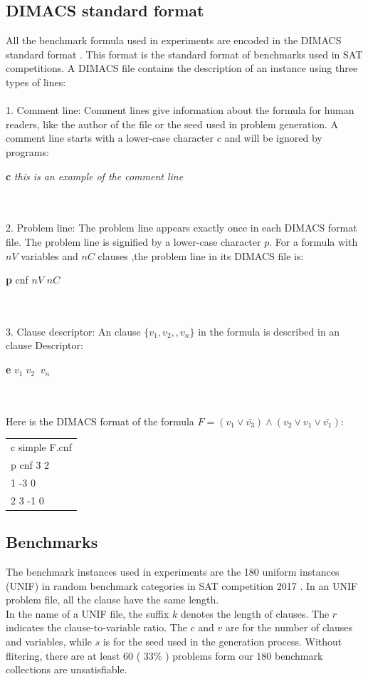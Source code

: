 \documentclass[12pt,a4paper,twoside]{scrartcl}
\numberwithin{equation}{section}
\begin{document}
\subsection{DIMACS standard format}  
All the benchmark formula used in experiments are encoded in the DIMACS standard format \cite{balyo2017proceedings}. This format is the standard format of benchmarks used in SAT competitions. A DIMACS file contains the description of an instance using three types of lines:\\
\\ 1. Comment line: Comment lines give information about the formula for human readers, like the author of the file or the seed used in problem generation. A comment line starts with a lower-case character $c$ and will be ignored by programs:\\ \centerline{\textbf{c} \emph{ this is an example of the comment line }}\\ \\ 2. Problem line: The problem line appears exactly once in each DIMACS format file. The problem line is signified by a lower-case character $p$.  For a formula with $nV$ variables and $nC$ clauses ,the problem line in its DIMACS file is:\\ \centerline{\textbf{p} cnf $nV$ $nC$}\\ \\ 3. Clause descriptor: An clause $\{v_1, v_2,, v_n\}$ in the formula is described in an clause Descriptor:\\ \centerline{\textbf{e} $v_1\; v_2\;  \;v_n$}\\  
\\
Here is the DIMACS format of the formula $F = (v_1 \lor \bar{v_3}) \land (v_2 \lor v_1 \lor \bar{v_1})$:
\begin{center}
\begin{tabular}{l}
c simple F.cnf\\
p cnf 3 2\\
1 -3 0\\
2 3 -1 0 \\
\end{tabular}
\end{center}

\subsection{Benchmarks}
\label{benchmark}
The benchmark instances used in experiments are the 180 uniform instances (UNIF) in random benchmark categories in SAT competition 2017 \cite{balyo2017proceedings}. In an UNIF problem file, all the clause have the same length.\\
In the name of a UNIF file, the suffix $k$  denotes the length of clauses. The $r$ indicates the clause-to-variable ratio. The $c$ and $v$ are for the number of clauses and variables, while $s$ is for the seed used in the generation process.
Without flitering, there are at least $60$ ( $33\%$ ) problems form our $180$ benchmark collections are unsatisfiable.
\end{document}
